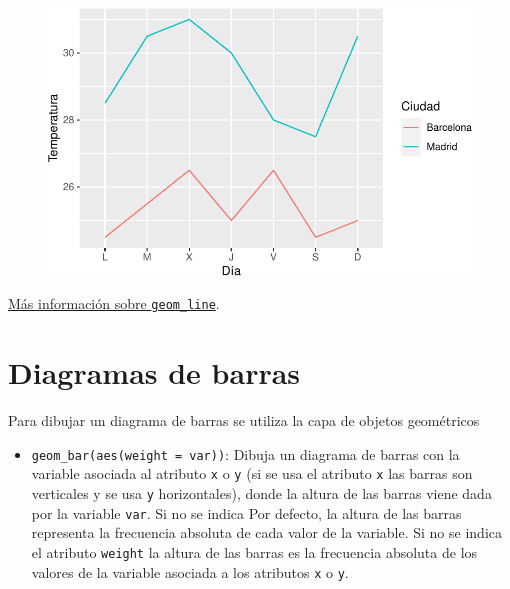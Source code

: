 \documentclass[
  a4paper,
]{scrreport}
\providecommand{\tightlist}{%
  \setlength{\itemsep}{0pt}\setlength{\parskip}{0pt}}\usepackage{longtable,booktabs,array}
\theoremstyle{definition}
\theoremstyle{definition}
\theoremstyle{remark}
\begin{document}
\begin{figure}[H]

{\centering \includegraphics{./07-graficos_files/figure-pdf/unnamed-chunk-8-1.pdf}

}

\end{figure}

\href{https://ggplot2.tidyverse.org/reference/geom_path.html}{Más
información sobre \texttt{geom\_line}}.

\hypertarget{diagramas-de-barras}{%
\section{Diagramas de barras}\label{diagramas-de-barras}}

Para dibujar un diagrama de barras se utiliza la capa de objetos
geométricos

\begin{itemize}
\tightlist
\item
  \texttt{geom\_bar(aes(weight\ =\ var))}: Dibuja un diagrama de barras
  con la variable asociada al atributo \texttt{x} o \texttt{y} (si se
  usa el atributo \texttt{x} las barras son verticales y se usa
  \texttt{y} horizontales), donde la altura de las barras viene dada por
  la variable \texttt{var}. Si no se indica Por defecto, la altura de
  las barras representa la frecuencia absoluta de cada valor de la
  variable. Si no se indica el atributo \texttt{weight} la altura de las
  barras es la frecuencia absoluta de los valores de la variable
  asociada a los atributos \texttt{x} o \texttt{y}.
\end{itemize}
\end{document}
